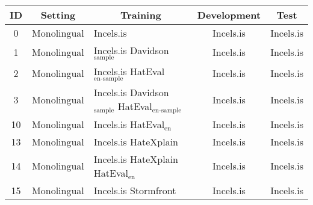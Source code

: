 \begin{tabular}{|c|c|p{4cm}|c|c|}
\hline
ID & Setting & \multicolumn{1}{c|}{Training} & Development & Test \\ \hline
0 & Monolingual & Incels.is & Incels.is & Incels.is \\ \hline
1 & Monolingual & Incels.is \newline Davidson$_{\mbox{sample}}$ & Incels.is & Incels.is \\ \hline
2 & Monolingual & Incels.is \newline HatEval$_{\mbox{en-sample}}$ & Incels.is & Incels.is \\ \hline
3 & Monolingual & Incels.is \newline Davidson$_{\mbox{sample}}$ \newline HatEval$_{\mbox{en-sample}}$ & Incels.is & Incels.is \\ \hline
10 & Monolingual & Incels.is \newline HatEval$_{\mbox{en}}$ & Incels.is & Incels.is \\ \hline
13 & Monolingual & Incels.is \newline HateXplain & Incels.is & Incels.is \\ \hline
14 & Monolingual & Incels.is \newline HateXplain \newline HatEval$_{\mbox{en}}$ & Incels.is & Incels.is \\ \hline
15 & Monolingual & Incels.is \newline Stormfront & Incels.is & Incels.is \\ \hline

\end{tabular}
